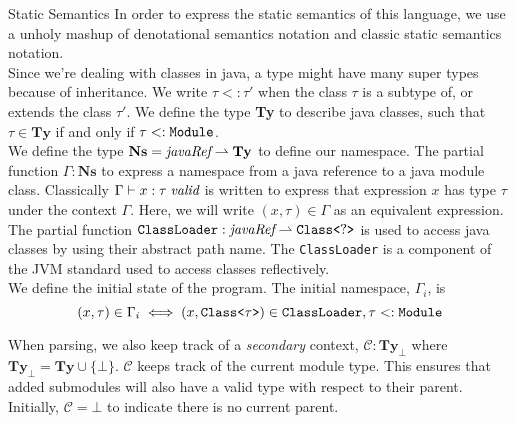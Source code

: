 \documentclass[11pt]{article}
\begin{document}
\begin{section}{Static Semantics}
In order to express the static semantics of this language, we use a unholy mashup of denotational semantics notation and classic static semantics notation.\\ 

Since we're dealing with classes in java, a type might have many super types because of inheritance. We write $\tau <: \tau'$ when the class $\tau$ is a subtype of, or extends the class $\tau'$. We define the type \textbf{Ty} to describe java classes, such that $\tau \in \textbf{Ty}$ if and only if $\tau <: \verb|Module|$.\\

We define the type $\textbf{Ns} = \emph{javaRef} \rightharpoonup \textbf{Ty}$ to define our namespace. The  partial function $\Gamma : \textbf{Ns}$ to express a namespace from a java reference to a java module class. Classically $\Gamma \vdash x : \tau\;\emph{valid}$ is written to express that expression $x$  has type $\tau$ under the context $\Gamma$. Here, we will write $(x, \tau) \in \Gamma$ as an equivalent expression.\\

The partial function $\verb|ClassLoader| : \emph{javaRef} \rightharpoonup \verb|Class<|?\verb|>|$ is used to access java classes by using their abstract path name. The \verb|ClassLoader| is a component of the JVM standard used to access classes reflectively. \\

We define the initial state of the program. The initial namespace, $\Gamma_i$, is 
\[(x, \tau) \in \Gamma_i \iff (x, \verb|Class<|\tau\verb|>|) \in \verb|ClassLoader|, \tau <: \verb|Module|\]

When parsing, we also keep track of a \emph{secondary} context, $\mathcal{C} : \textbf{Ty}_\bot$ where $\textbf{Ty}_\bot = \textbf{Ty}\cup\{\bot\}$. $\mathcal{C}$ keeps track of the current module type. This ensures that added submodules will also have a valid type with respect to their parent. Initially, $\mathcal{C} = \bot$ to indicate there is no current parent.\\


\end{section}
\end{document}
